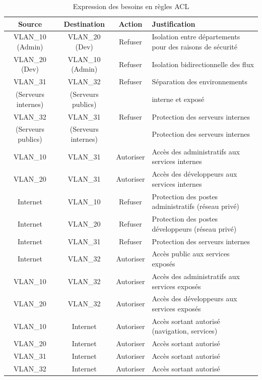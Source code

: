 \documentclass[12pt,a4paper, oneside]{memoir}
\begin{document}
\begin{table}[H]
	\centering
	\renewcommand{\arraystretch}{1.3}
	\begin{tabular}{|c|c|c|p{6cm}|}
		\hline
		\textbf{Source} & \textbf{Destination} & \textbf{Action} & \textbf{Justification} \\
		\hline
		VLAN\_10 (Admin) & VLAN\_20 (Dev) & Refuser & Isolation entre départements pour des raisons de sécurité \\
		\hline
		VLAN\_20 (Dev) & VLAN\_10 (Admin) & Refuser & Isolation bidirectionnelle des flux \\
		\hline
		
		VLAN\_31  & VLAN\_32  & Refuser & Séparation des environnements \\
		(Serveurs internes) & (Serveurs publics) &  & interne et exposé  \\
		\hline
		
		VLAN\_32  & VLAN\_31  & Refuser & Protection des serveurs internes \\
		(Serveurs publics) & (Serveurs internes) &  & Protection des serveurs internes \\
		\hline
		
		VLAN\_10 & VLAN\_31 & Autoriser & Accès des administratifs aux services internes \\
		\hline
		VLAN\_20 & VLAN\_31 & Autoriser & Accès des développeurs aux services internes \\
		\hline
		Internet & VLAN\_10 & Refuser & Protection des postes administratifs (réseau privé) \\
		\hline
		Internet & VLAN\_20 & Refuser & Protection des postes développeurs (réseau privé) \\
		\hline
		Internet & VLAN\_31 & Refuser & Protection des serveurs internes \\
		\hline
		Internet & VLAN\_32 & Autoriser & Accès public aux services exposés \\
		\hline
		VLAN\_10 & VLAN\_32 & Autoriser & Accès des administratifs aux services exposés \\
		\hline
		VLAN\_20 & VLAN\_32 & Autoriser & Accès des développeurs aux services exposés \\
		\hline
		\hline
		VLAN\_10 & Internet & Autoriser & Accès sortant autorisé (navigation, services) \\
		\hline
		VLAN\_20 & Internet & Autoriser & Accès sortant autorisé \\
		\hline
		VLAN\_31 & Internet & Autoriser & Accès sortant autorisé \\
		\hline
		VLAN\_32 & Internet & Autoriser & Accès sortant autorisé \\
		\hline
	\end{tabular}
	\caption{Expression des besoins en règles ACL}
	\label{tab:besoins_acl}
\end{table}
\end{document}
